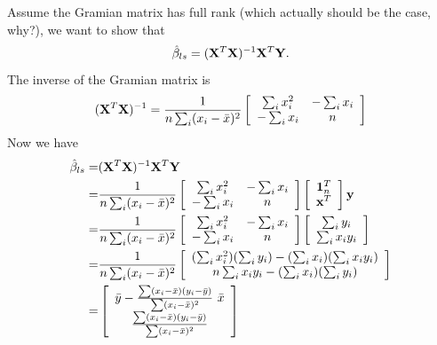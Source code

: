 Assume the Gramian matrix has full rank (which actually should be the case, why?), we want to show that 
$$
\hat{\beta}_{ls} = (\mathbf{X}^T\mathbf{X})^{-1}\mathbf{X}^T\mathbf{Y}.
$$
%
The inverse of the Gramian matrix is
$$
 (\mathbf{X}^T\mathbf{X})^{-1} = \frac{1}{n\sum_i(x_i - \bar{x})^2} \left[ \begin{array}{cc} \sum_i x_i^2 & -\sum_i x_i\\ -\sum_i x_i  & n\\ \end{array} \right]
$$
%
Now we have
\begin{equation*}
\begin{aligned}
\hat{\beta}_{ls}
=& (\mathbf{X}^T\mathbf{X})^{-1}\mathbf{X}^T\mathbf{Y}\\=&
  \frac{1}{n\sum_i(x_i - \bar{x})^2} \left[ \begin{array}{cc} \sum_i x_i^2 & -\sum_i x_i\\ -\sum_i x_i  & n\\ \end{array} \right] \left[ \begin{array}{c} \mathbf{1}_n^T \\ \mathbf{x}^T\\ \end{array} \right] \mathbf{y} \\
=& \frac{1}{n\sum_i(x_i - \bar{x})^2} \left[ \begin{array}{cc} \sum_i x_i^2 & -\sum_i x_i\\ -\sum_i x_i  & n\\ \end{array} \right]  \left[ \begin{array}{c} \sum_i{y_i}\\ \sum_i{x_i y_i} \\ \end{array} \right] \\
=& \frac{1}{n\sum_i(x_i - \bar{x})^2} \left[ \begin{array}{c} (\sum_i x_i^2)(\sum_i y_i) -(\sum_i x_i)(\sum_i x_i y_i)\\ n\sum_i{x_i y_i} - (\sum_i x_i)(\sum_i y_i) \\ \end{array} \right]  \\
= & \left[
\begin{array}{c}
\bar{y} - \frac{\sum(x_i - \bar{x})(y_i - \bar{y})}{\sum(x_i - \bar{x})^2}\ \bar{x}\\
\frac{\sum(x_i - \bar{x})(y_i - \bar{y})}{\sum(x_i - \bar{x})^2}\\
\end{array}
\right]
\end{aligned}
\end{equation*}

